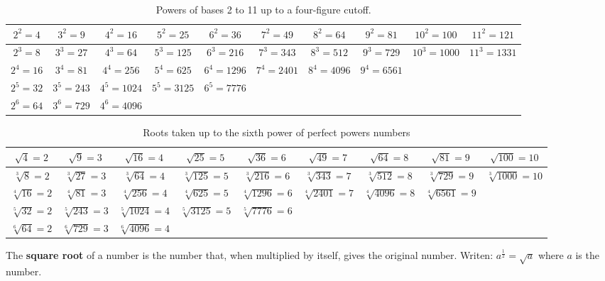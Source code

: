 \documentclass[12pt, a4paper, addpoints]{exam}
\newcommand{\ts}{\vspace{11mm}}
\begin{document}
\begin{questions}
\begin{table}[h!]
\centering
\renewcommand{\arraystretch}{2}
\setlength{\tabcolsep}{2pt}
\begin{tabular}{|c|c|c|c|c|c|c|c|c|c|}
\hline
$2^2 = 4$   & $3^2 = 9$   & $4^2 = 16$  & $5^2 = 25$  & $6^2 = 36$  & $7^2 = 49$  & $8^2 = 64$  & $9^2 = 81$  & $10^2 = 100$ & $11^2 = 121$ \\ \hline
$2^3 = 8$   & $3^3 = 27$  & $4^3 = 64$  & $5^3 = 125$ & $6^3 = 216$ & $7^3 = 343$ & $8^3 = 512$ & $9^3 = 729$ & $10^3 = 1000$ & $11^3 = 1331$ \\ \hline
$2^4 = 16$  & $3^4 = 81$  & $4^4 = 256$ & $5^4 = 625$ & $6^4 = 1296$ & $7^4 = 2401$ & $8^4 = 4096$ & $9^4 = 6561$ &  &  \\ \hline
$2^5 = 32$  & $3^5 = 243$ & $4^5 = 1024$ & $5^5 = 3125$ & $6^5 = 7776$ &  &  & &  & \\ \hline
$2^6 = 64$  & $3^6 = 729$ & $4^6 = 4096$ & &&&&&&\\ \hline
\end{tabular}
\caption{Powers of bases 2 to 11 up to a four-figure cutoff.}
\end{table}







\begin{table}[h!]
\centering
\renewcommand{\arraystretch}{2}
\setlength{\tabcolsep}{2pt}
\begin{tabular}{|c|c|c|c|c|c|c|c|c|}
\hline

$\sqrt{4} = 2$   & $\sqrt{9} = 3$   & $\sqrt{16} = 4$  & $\sqrt{25} = 5$  & $\sqrt{36} = 6$  & $\sqrt{49} = 7$  & $\sqrt{64} = 8$  & $\sqrt{81} = 9$  & $\sqrt{100} = 10$ \\ \hline
$\sqrt[3]{8} = 2$   & $\sqrt[3]{27} = 3$  & $\sqrt[3]{64} = 4$  & $\sqrt[3]{125} = 5$ & $\sqrt[3]{216} = 6$ & $\sqrt[3]{343} = 7$ & $\sqrt[3]{512} = 8$ & $\sqrt[3]{729} = 9$ & $\sqrt[3]{1000} = 10$  \\ \hline
$\sqrt[4]{16} = 2$  & $\sqrt[4]{81} = 3$  & $\sqrt[4]{256} = 4$ & $\sqrt[4]{625} = 5$ & $\sqrt[4]{1296} = 6$ & $\sqrt[4]{2401} = 7$ & $\sqrt[4]{4096} = 8$ & $\sqrt[4]{6561} = 9$ &    \\ \hline
$\sqrt[5]{32} = 2$  & $\sqrt[5]{243} = 3$ & $\sqrt[5]{1024} = 4$ & $\sqrt[5]{3125} = 5$ & $\sqrt[5]{7776} = 6$ &  &  & &   \\ \hline
$\sqrt[6]{64} = 2$  & $\sqrt[6]{729} = 3$ & $\sqrt[6]{4096} = 4$ &&&&&&\\ \hline
\end{tabular}
\caption{Roots taken up to the  sixth power of perfect powers numbers}
\end{table}
\ts
\ts
\question The \textbf{square root} of a number is the number that, when multiplied by itself, gives the original number. Writen:    $a^{\frac{1}{2}} = \sqrt{a}$ where \(a\) is the number.


\end{questions}
\end{document}
